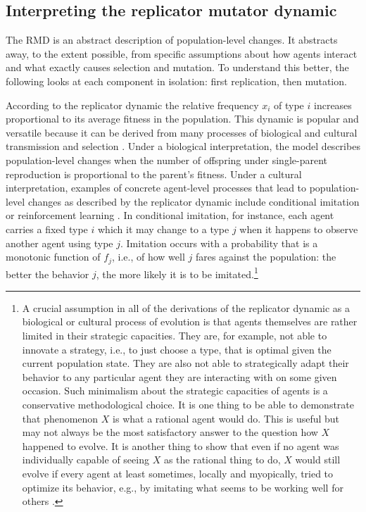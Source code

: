 \documentclass[a4paper, 11pt]{article}
\theoremstyle{Satz}
\begin{document}
\subsection{Interpreting the replicator mutator dynamic}

The RMD is an abstract description of population-level changes. It abstracts away, to the
extent possible, from specific assumptions about how agents interact and what exactly causes
selection and mutation. To understand this better, the following looks at each component in
isolation: first replication, then mutation.

According to the replicator dynamic the relative frequency $x_i$ of type $i$ increases
proportional to its average fitness in the population. This dynamic is popular and versatile
because it can be derived from many processes of biological and cultural transmission and
selection \citep[for overview and several derivations
see][]{Sandholm2010:Population-Game}. Under a biological interpretation, the model describes
population-level changes when the number of offspring under single-parent reproduction is
proportional to the parent's fitness. Under a cultural interpretation, examples of concrete
agent-level processes that lead to population-level changes as described by the replicator
dynamic include conditional imitation
\citep[e.g.,][]{Helbing1996:A-Stochastic-Be,Schlag1998:Why-Imitate-and} or reinforcement
learning \citep[e.g.,][]{BorgersSarin997:Learning-Throug,Beggs2005:On-the-Converge}. In
conditional imitation, for instance, each agent carries a fixed type $i$ which it may change to
a type $j$ when it happens to observe another agent using type $j$. Imitation occurs with a
probability that is a monotonic function of $f_j$, i.e., of how well $j$ fares against the
population: the better the behavior $j$, the more likely it is to be imitated.\footnote{A
  crucial assumption in all of the derivations of the replicator dynamic as a biological or
  cultural process of evolution is that agents themselves are rather limited in their strategic
  capacities. They are, for example, not able to innovate a strategy, i.e., to just choose a
  type, that is optimal given the current population state. They are also not able to
  strategically adapt their behavior to any particular agent they are interacting with on some
  given occasion. Such minimalism about the strategic capacities of agents is a conservative
  methodological choice. It is one thing to be able to demonstrate that phenomenon $X$ is what
  a rational agent would do. This is useful but may not always be the most satisfactory answer
  to the question how $X$ happened to evolve. It is another thing to show that even if no agent
  was individually capable of seeing $X$ as the rational thing to do, $X$ would still evolve if
  every agent at least sometimes, locally and myopically, tried to optimize its behavior, e.g.,
  by imitating what seems to be working well for others \citep{Skyrms2010:Signals}.}
\end{document}
